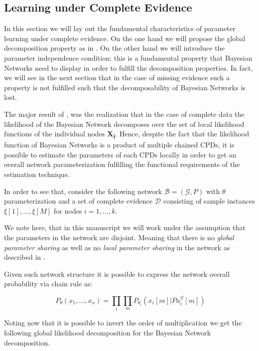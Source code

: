 \documentclass[11pt]{article}
\begin{document}
\begin{article}
\newpage

\section{Learning under Complete Evidence}
\label{complete-learning}
In this section we will lay out the fundamental characteristics of
parameter learning under complete evidence. On the one hand we will
propose the global decomposition property as in
\cite{spiegelhalter1990sequential}. On the other hand we will
introduce the parameter independence condition; this is a
fundamental property that Bayesian Networks need to display in order
to fulfill the decomposition properties. In fact, we will see in the
next section that in the case of missing evidence such a property is
not fulfilled such that the decomposability of Bayesian Networks is
lost.

The major result of \cite{spiegelhalter1990sequential}, was the
realization that in the case of complete data the likelihood of the
Bayesian Network decomposes over the set of local likelihood
functions of the individual nodes \textbf{X\textsubscript{i}}. Hence, despite the fact
that the likelihood function of Bayesian Networks is a product of
multiple chained CPDs, it is possible to estimate the parameters of
each CPDs locally in order to get an overall network
parameterization fulfilling the functional requirements of the
estimation technique.

In order to see that, consider the following network \(\mathscr{B} =
  (\mathscr{G}, P)\) with \(\theta\) parameterization and a set of complete
evidence \(\mathscr{D}\) consisting of sample instances \(\xi[1], ...,
  \xi[M]\) for nodes \(i = 1, ..., k\).

We note here, that in this manuscript we will work under the
assumption that the parameters in the network are disjoint. Meaning
that there is no \emph{global parameter sharing} as well as no \emph{local
parameter sharing} in the network as described in
\cite{koller2009probabilistic}.

Given such network structure it is possible to express the network
overall probability via chain rule as:

\begin{equation} \label{eq:global_decomposition}
P_{\theta} (x_1, ..., x_n) = \prod_i \prod_m P_{\theta_i}(x_i[m] | Pa_i^{\mathscr{G}}[m])  \nonumber
\end{equation}

Noting now that it is possible to invert the order of multiplication
we get the following global likelihood decomposition for the
Bayesian Network decomposition. 


\end{article}
\end{document}

